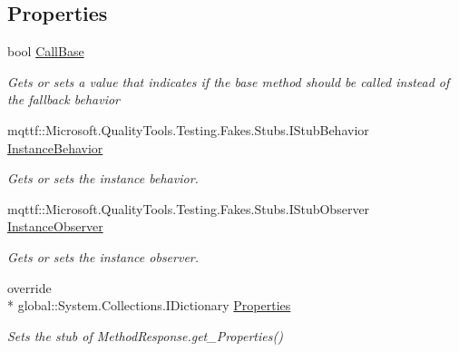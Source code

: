 \subsection*{Properties}
\begin{DoxyCompactItemize}
\item 
bool \hyperlink{class_system_1_1_runtime_1_1_remoting_1_1_messaging_1_1_fakes_1_1_stub_method_response_afd23b9ba6020f3602fa103d36841043b}{Call\-Base}
\begin{DoxyCompactList}\small\item\em Gets or sets a value that indicates if the base method should be called instead of the fallback behavior\end{DoxyCompactList}\item 
mqttf\-::\-Microsoft.\-Quality\-Tools.\-Testing.\-Fakes.\-Stubs.\-I\-Stub\-Behavior \hyperlink{class_system_1_1_runtime_1_1_remoting_1_1_messaging_1_1_fakes_1_1_stub_method_response_a487246c8e961331f02e38173ccf7b59a}{Instance\-Behavior}
\begin{DoxyCompactList}\small\item\em Gets or sets the instance behavior.\end{DoxyCompactList}\item 
mqttf\-::\-Microsoft.\-Quality\-Tools.\-Testing.\-Fakes.\-Stubs.\-I\-Stub\-Observer \hyperlink{class_system_1_1_runtime_1_1_remoting_1_1_messaging_1_1_fakes_1_1_stub_method_response_a16d56ae2e537e7a4a0eb547a4a210aac}{Instance\-Observer}
\begin{DoxyCompactList}\small\item\em Gets or sets the instance observer.\end{DoxyCompactList}\item 
override \\*
global\-::\-System.\-Collections.\-I\-Dictionary \hyperlink{class_system_1_1_runtime_1_1_remoting_1_1_messaging_1_1_fakes_1_1_stub_method_response_a5db6ad724af326ead96694eb284da3b7}{Properties}
\begin{DoxyCompactList}\small\item\em Sets the stub of Method\-Response.\-get\-\_\-\-Properties()\end{DoxyCompactList}\end{DoxyCompactItemize}


